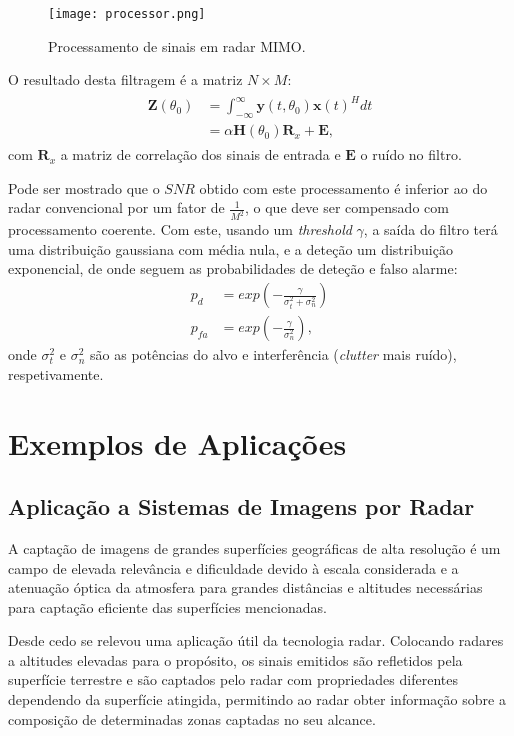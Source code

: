 \documentclass[purist,portuguese]{ist-report}
\begin{document}
\begin{figure}[ht]
  \centering
  \texttt{[image: processor.png]}
  \caption{Processamento de sinais em radar MIMO.}
  \label{fig:proc}
\end{figure}

O resultado desta filtragem é a matriz $N\times M$:
\begin{align}
  \begin{aligned}
    \mathbf{Z}(\theta_0) &= \int_{-\infty}^{\infty} \mathbf{y}(t,\theta_0)\mathbf{x}(t)^Hdt \\
	&= \alpha \mathbf{H}(\theta_0)\mathbf{R}_x + \mathbf{E} ,
  \end{aligned}
  \label{eq:Z}
\end{align}
com $\mathbf{R}_x$ a matriz de correlação dos sinais de entrada e $\mathbf{E}$ o ruído no filtro.

Pode ser mostrado que o $SNR$ obtido com este processamento é inferior ao do radar convencional por um fator de $\frac{1}{M^2}$, o que deve ser compensado com processamento coerente.
Com este, usando um \textit{threshold} $\gamma$, a saída do filtro terá uma distribuição gaussiana com média nula, e a deteção um distribuição exponencial, de onde seguem as probabilidades de deteção e falso alarme:
\begin{align}
  p_d &= exp\left( -\frac{\gamma}{\sigma_t^2 + \sigma_n^2} \right) \label{eq:pd} \\
  p_{fa} &= exp\left( -\frac{\gamma}{\sigma_n^2} \right) \label{eq:pfa},
\end{align}
onde $\sigma_t^2$ e $\sigma_n^2$ são as potências do alvo e interferência (\textit{clutter} mais ruído), respetivamente.


\section{Exemplos de Aplicações}

\subsection{Aplicação a Sistemas de Imagens por Radar}

A captação de imagens de grandes superfícies geográficas de alta resolução é um campo de elevada relevância e dificuldade devido à escala considerada e a atenuação óptica da atmosfera para grandes distâncias e altitudes necessárias para captação eficiente das superfícies mencionadas.

Desde cedo se relevou uma aplicação útil da tecnologia radar. Colocando radares a altitudes elevadas para o propósito, os sinais emitidos são refletidos pela superfície terrestre e são captados pelo radar com propriedades diferentes dependendo da superfície atingida, permitindo ao radar obter informação sobre a composição de determinadas zonas captadas no seu alcance.
\end{document}

